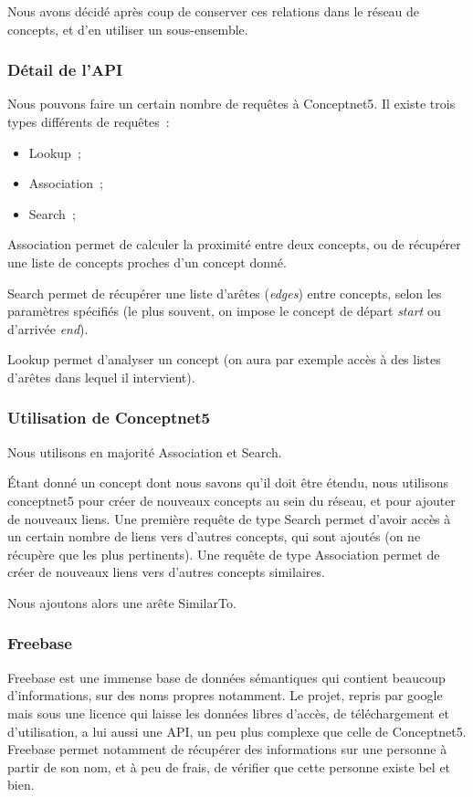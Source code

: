 \documentclass[a4paper, 12pt]{article}
\newcommand{\ang}[1]{\textit{#1}}%
\begin{document}
Nous avons décidé après coup de conserver ces relations dans le réseau de concepts, et d'en utiliser un sous-ensemble.

\subsubsection{Détail de l'API}

Nous pouvons faire un certain nombre de requêtes à Conceptnet5. Il existe trois types différents de requêtes~:
\begin{itemize}
 \item Lookup~;
 \item Association~;
 \item Search~;
\end{itemize}
Association permet de calculer la proximité entre deux concepts, ou de récupérer une liste de concepts proches d'un concept donné.

Search permet de récupérer une liste d'arêtes (\ang{edges}) entre concepts, selon les paramètres spécifiés (le plus souvent, on impose le concept de départ \ang{start} ou d'arrivée \ang{end}). 

Lookup permet d'analyser un concept (on aura par exemple accès à des listes d'arêtes dans lequel il intervient).


\subsubsection{Utilisation de Conceptnet5}

Nous utilisons en majorité Association et Search.

Étant donné un concept dont nous savons qu'il doit être étendu, nous utilisons conceptnet5 pour créer de nouveaux concepts au sein du réseau, et pour ajouter de nouveaux liens. Une première requête de type Search permet d'avoir accès à un certain nombre de liens vers d'autres concepts, qui sont ajoutés (on ne récupère que les plus pertinents). Une requête de type Association permet de créer de nouveaux liens vers d'autres concepts similaires.

Nous ajoutons alors une arête SimilarTo.
    
\subsubsection{Freebase}

Freebase est une immense base de données sémantiques qui contient beaucoup d'informations, sur des noms propres notamment. Le projet, repris par google mais sous une licence qui laisse les données libres d'accès, de téléchargement et d'utilisation, a lui aussi une API, un peu plus complexe que celle de Conceptnet5. Freebase permet notamment de récupérer des informations sur une personne à partir de son nom, et à peu de frais, de vérifier que cette personne existe bel et bien.
\end{document}
